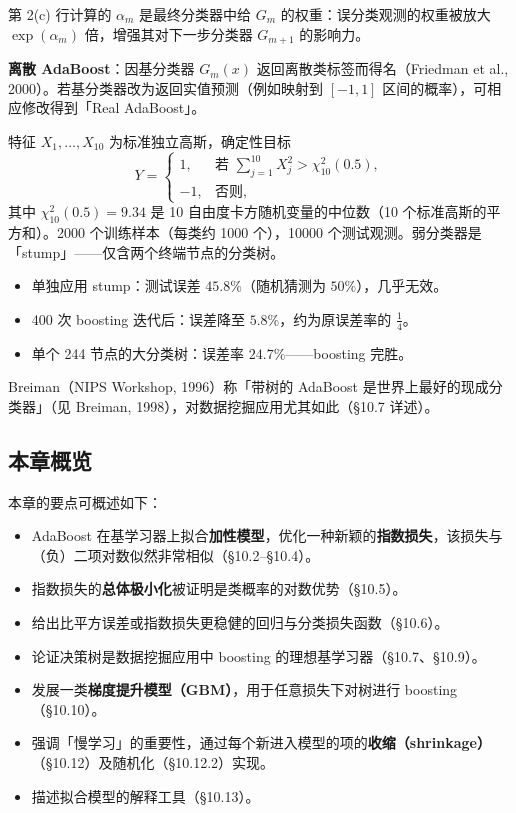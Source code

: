 第 2(c) 行计算的 $\alpha_m$ 是最终分类器中给 $G_m$ 的权重：误分类观测的权重被放大 $\exp(\alpha_m)$ 倍，增强其对下一步分类器 $G_{m+1}$ 的影响力。

\textbf{离散 AdaBoost}：因基分类器 $G_m(x)$ 返回离散类标签而得名（Friedman et al., 2000）。若基分类器改为返回实值预测（例如映射到 $[-1,1]$ 区间的概率），可相应修改得到「Real AdaBoost」。

\begin{example}
特征 $X_1, \ldots, X_{10}$ 为标准独立高斯，确定性目标
\begin{equation}\label{eq:10_2}
    Y = \begin{cases} 1, & \text{若 } \sum_{j=1}^{10} X_j^2 > \chi^2_{10}(0.5),\\ -1, & \text{否则}, \end{cases}
\end{equation}
其中 $\chi^2_{10}(0.5) = 9.34$ 是 10 自由度卡方随机变量的中位数（10 个标准高斯的平方和）。2000 个训练样本（每类约 1000 个），10000 个测试观测。弱分类器是「stump」——仅含两个终端节点的分类树。
\begin{itemize}
    \item 单独应用 stump：测试误差 $45.8\%$（随机猜测为 $50\%$），几乎无效。
    \item 400 次 boosting 迭代后：误差降至 $5.8\%$，约为原误差率的 $\frac{1}{4}$。
    \item 单个 244 节点的大分类树：误差率 $24.7\%$——boosting 完胜。
\end{itemize}
Breiman（NIPS Workshop, 1996）称「带树的 AdaBoost 是世界上最好的现成分类器」（见 Breiman, 1998），对数据挖掘应用尤其如此（§10.7 详述）。
\end{example}

\subsection{本章概览}

本章的要点可概述如下：
\begin{itemize}
    \item AdaBoost 在基学习器上拟合\textbf{加性模型}，优化一种新颖的\textbf{指数损失}，该损失与（负）二项对数似然非常相似（§10.2--§10.4）。
    \item 指数损失的\textbf{总体极小化}被证明是类概率的对数优势（§10.5）。
    \item 给出比平方误差或指数损失更稳健的回归与分类损失函数（§10.6）。
    \item 论证决策树是数据挖掘应用中 boosting 的理想基学习器（§10.7、§10.9）。
    \item 发展一类\textbf{梯度提升模型（GBM）}，用于任意损失下对树进行 boosting（§10.10）。
    \item 强调「慢学习」的重要性，通过每个新进入模型的项的\textbf{收缩（shrinkage）}（§10.12）及随机化（§10.12.2）实现。
    \item 描述拟合模型的解释工具（§10.13）。
\end{itemize}

